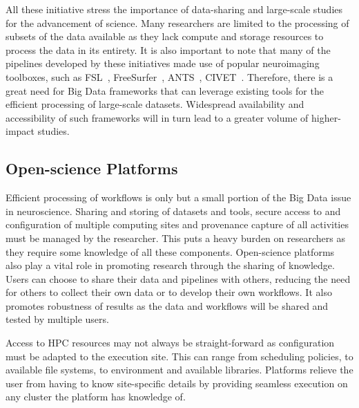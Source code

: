             All these initiative stress the importance of data-sharing and
            large-scale studies for the advancement of science. Many researchers
            are limited to the processing of subsets of the data available as
            they lack compute and storage resources to process the data in its
            entirety. It is also important to note that many of the pipelines
            developed by these initiatives made use of popular neuroimaging
            toolboxes, such as FSL~\cite{SMITH2004S208}, FreeSurfer~\cite{freesurfer}, ANTS~\cite{ants},
            CIVET~\cite{civet}. Therefore, there is a great
            need for Big Data frameworks that can leverage existing tools for
            the efficient processing of large-scale datasets. Widespread
            availability and accessibility of such frameworks will in turn lead
            to a greater volume of higher-impact studies.


        \subsection{Open-science Platforms}\label{platforms} Efficient
            processing of workflows is only but a small portion of the Big Data
            issue in neuroscience.
            Sharing and storing of datasets and tools, secure access to and
            configuration of multiple computing sites and provenance capture of
            all activities must be managed by the researcher. This puts a heavy
            burden on researchers as they require some knowledge of all these
            components. Open-science platforms also
            play a vital role in promoting research through the sharing of
            knowledge. Users can choose to share their data and pipelines with
            others, reducing the need for others to collect their own data or to
            develop their own workflows. It also promotes robustness of results
            as the data and workflows will be shared and tested by multiple
            users.

            Access to HPC resources may not always be straight-forward as
            configuration must be adapted to the execution site. This can range
            from scheduling policies, to available file systems, to environment
            and available libraries. Platforms relieve the user from having to
            know site-specific details by providing seamless execution on any
            cluster the platform has knowledge of.

